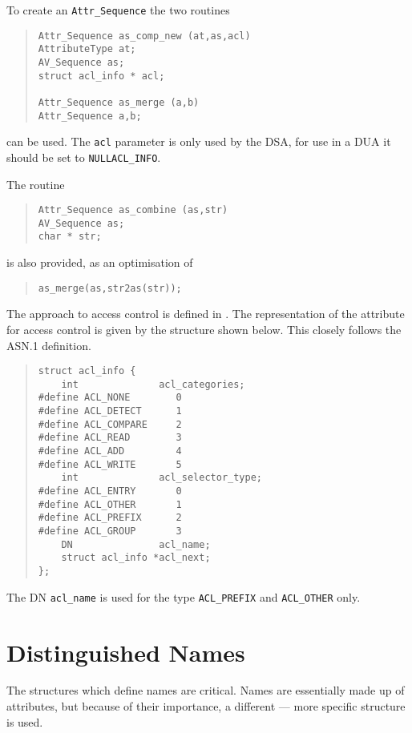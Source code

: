 To create an \verb"Attr_Sequence" the two routines
\begin{quote}\small\begin{verbatim}
Attr_Sequence as_comp_new (at,as,acl)
AttributeType at;
AV_Sequence as;
struct acl_info * acl;

Attr_Sequence as_merge (a,b)
Attr_Sequence a,b;
\end{verbatim}\end{quote}
can be used.
The \verb"acl" parameter is only used by the DSA, for use in a DUA it should be
set to \verb"NULLACL_INFO".

The routine
\begin{quote}\small\begin{verbatim}
Attr_Sequence as_combine (as,str)
AV_Sequence as;
char * str;
\end{verbatim}\end{quote}
is also provided, as an optimisation of
\begin{quote}\small\begin{verbatim}
as_merge(as,str2as(str));
\end{verbatim}\end{quote}

The approach to access control is defined in
\cite{QUIPU.Design}.
The representation of the attribute for access control is given by the
structure shown below.  This closely follows the ASN.1
definition.

\begin{quote}\small\begin{verbatim}
struct acl_info {
    int              acl_categories;
#define ACL_NONE        0
#define ACL_DETECT      1
#define ACL_COMPARE     2
#define ACL_READ        3
#define ACL_ADD         4
#define ACL_WRITE       5
    int              acl_selector_type;
#define ACL_ENTRY       0
#define ACL_OTHER       1
#define ACL_PREFIX      2
#define ACL_GROUP       3
    DN               acl_name;
    struct acl_info *acl_next;
};
\end{verbatim}\end{quote}

The DN \verb"acl_name" is used for the type \verb"ACL_PREFIX" and
\verb"ACL_OTHER" only.

\section {Distinguished Names}
The structures which define names are critical.  
Names are essentially made up of attributes, but because of their
importance, a different --- more specific structure is used.

